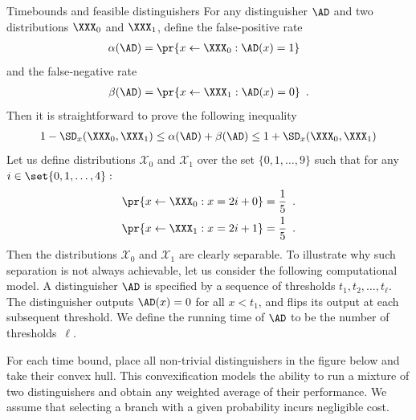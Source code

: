\documentclass{crypto-exercise}
\author{Sven Laur}
\begin{document}
\begin{exercise}{Timebounds and feasible distinguishers}
For any distinguisher $\AD$ and two distributions $\XXX_0$ and $\XXX_1$, define the false-positive rate
\begin{align*}
\alpha(\AD)=\pr{x\gets\XXX_0: \AD(x)=1}\enspace\phantom{.}
\end{align*}
and the false‑negative rate 
\begin{align*}
\beta(\AD)=\pr{x\gets\XXX_1: \AD(x)=0}\enspace.
\end{align*}
Then it is straightforward to prove the following inequality 
\begin{align}\label{ineq}
1-\SD_x(\XXX_0,\XXX_1)\leq \alpha(\AD) +\beta(\AD)\leq 1+\SD_x(\XXX_0,\XXX_1)
\end{align}
Let us define distributions $\mathcal{X}_0$ and $\mathcal{X}_1$ over the set $\{0,1,\ldots, 9\}$ such that for any $i\in\set{0, 1,\ldots, 4}:$
\begin{align*}
\pr{x\gets \XXX_0: x=2i+0}&=\frac{1}{5}\enspace.\\
\pr{x\gets \XXX_1: x=2i+1}&=\frac{1}{5}\enspace.
\end{align*}
Then the distributions $\mathcal{X}_0$ and $\mathcal{X}_1$ are  clearly separable. To illustrate why such separation is not always achievable, let us consider the following computational model. A distinguisher $\AD$ is specified by a sequence of thresholds $t_1, t_2, \ldots, t_\ell$. The distinguisher outputs $\AD(x)=0$ for all $x < t_1$, and flips its output at each subsequent threshold. We define the running time of $\AD$ to be the number of thresholds~$\ell$.

For each time bound, place all non-trivial distinguishers in the figure below and take their convex hull. This convexification models the ability to run a mixture of two distinguishers and obtain any weighted average of their performance. We assume that selecting a branch with a given probability incurs negligible cost.
\begin{center}
\end{center}



\end{exercise}


\begin{solution}
\end{solution}
\end{document}
